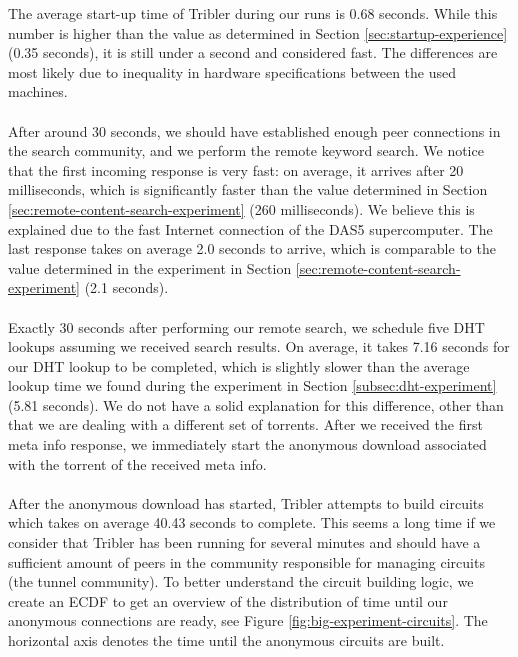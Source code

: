 \noindent The average start-up time of Tribler during our runs is 0.68 seconds. While this number is higher than the value as determined in Section \ref{sec:startup-experience} (0.35 seconds), it is still under a second and considered fast. The differences are most likely due to inequality in hardware specifications between the used machines.\\\\
After around 30 seconds, we should have established enough peer connections in the search community, and we perform the remote keyword search. We notice that the first incoming response is very fast: on average, it arrives after 20 milliseconds, which is significantly faster than the value determined in Section \ref{sec:remote-content-search-experiment} (260 milliseconds). We believe this is explained due to the fast Internet connection of the DAS5 supercomputer. The last response takes on average 2.0 seconds to arrive, which is comparable to the value determined in the experiment in Section \ref{sec:remote-content-search-experiment} (2.1 seconds).\\\\
Exactly 30 seconds after performing our remote search, we schedule five DHT lookups assuming we received search results. On average, it takes 7.16 seconds for our DHT lookup to be completed, which is slightly slower than the average lookup time we found during the experiment in Section \ref{subsec:dht-experiment} (5.81 seconds). We do not have a solid explanation for this difference, other than that we are dealing with a different set of torrents. After we received the first meta info response, we immediately start the anonymous download associated with the torrent of the received meta info.\\\\
After the anonymous download has started, Tribler attempts to build circuits which takes on average 40.43 seconds to complete. This seems a long time if we consider that Tribler has been running for several minutes and should have a sufficient amount of peers in the community responsible for managing circuits (the tunnel community). To better understand the circuit building logic, we create an ECDF to get an overview of the distribution of time until our anonymous connections are ready, see Figure \ref{fig:big-experiment-circuits}. The horizontal axis denotes the time until the anonymous circuits are built.\\

